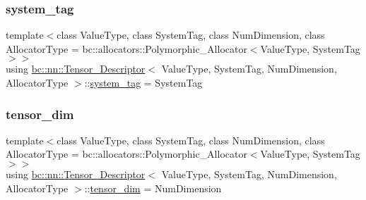 \mbox{\label{structbc_1_1nn_1_1Tensor__Descriptor_a206ee1df4b7e175b426f8cdb32d0a342}} 
\subsubsection{\texorpdfstring{system\+\_\+tag}{system\_tag}}
{\footnotesize\ttfamily template$<$class Value\+Type, class System\+Tag, class Num\+Dimension, class Allocator\+Type = bc\+::allocators\+::\+Polymorphic\+\_\+\+Allocator$<$\+Value\+Type, System\+Tag$>$$>$ \\
using \hyperlink{structbc_1_1nn_1_1Tensor__Descriptor}{bc\+::nn\+::\+Tensor\+\_\+\+Descriptor}$<$ Value\+Type, System\+Tag, Num\+Dimension, Allocator\+Type $>$\+::\hyperlink{structbc_1_1nn_1_1Tensor__Descriptor_a206ee1df4b7e175b426f8cdb32d0a342}{system\+\_\+tag} =  System\+Tag}

\mbox{\label{structbc_1_1nn_1_1Tensor__Descriptor_ac5c6e6bec82a01ad10cd2e6acc439532}} 
\subsubsection{\texorpdfstring{tensor\+\_\+dim}{tensor\_dim}}
{\footnotesize\ttfamily template$<$class Value\+Type, class System\+Tag, class Num\+Dimension, class Allocator\+Type = bc\+::allocators\+::\+Polymorphic\+\_\+\+Allocator$<$\+Value\+Type, System\+Tag$>$$>$ \\
using \hyperlink{structbc_1_1nn_1_1Tensor__Descriptor}{bc\+::nn\+::\+Tensor\+\_\+\+Descriptor}$<$ Value\+Type, System\+Tag, Num\+Dimension, Allocator\+Type $>$\+::\hyperlink{structbc_1_1nn_1_1Tensor__Descriptor_ac5c6e6bec82a01ad10cd2e6acc439532}{tensor\+\_\+dim} =  Num\+Dimension}

\mbox{\label{structbc_1_1nn_1_1Tensor__Descriptor_a9a0efa6c050542ee479a59bb8a252230}} 
